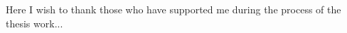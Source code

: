 
\begin{acknowledgements}
Here I wish to thank those who have supported me during the process of the thesis work...

\end{acknowledgements}


